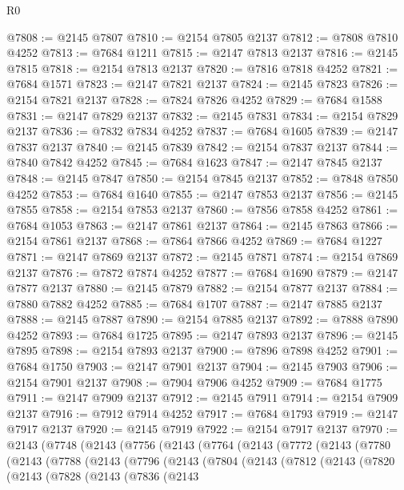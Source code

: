 \begin{lexlean}{R0}
\begin{coremodule}
@7808 := @2145 @7807
@7810 := @2154 @7805 @2137
@7812 := @7808 @7810 @4252
@7813 := @7684 @1211
@7815 := @2147 @7813 @2137
@7816 := @2145 @7815
@7818 := @2154 @7813 @2137
@7820 := @7816 @7818 @4252
@7821 := @7684 @1571
@7823 := @2147 @7821 @2137
@7824 := @2145 @7823
@7826 := @2154 @7821 @2137
@7828 := @7824 @7826 @4252
@7829 := @7684 @1588
@7831 := @2147 @7829 @2137
@7832 := @2145 @7831
@7834 := @2154 @7829 @2137
@7836 := @7832 @7834 @4252
@7837 := @7684 @1605
@7839 := @2147 @7837 @2137
@7840 := @2145 @7839
@7842 := @2154 @7837 @2137
@7844 := @7840 @7842 @4252
@7845 := @7684 @1623
@7847 := @2147 @7845 @2137
@7848 := @2145 @7847
@7850 := @2154 @7845 @2137
@7852 := @7848 @7850 @4252
@7853 := @7684 @1640
@7855 := @2147 @7853 @2137
@7856 := @2145 @7855
@7858 := @2154 @7853 @2137
@7860 := @7856 @7858 @4252
@7861 := @7684 @1053
@7863 := @2147 @7861 @2137
@7864 := @2145 @7863
@7866 := @2154 @7861 @2137
@7868 := @7864 @7866 @4252
@7869 := @7684 @1227
@7871 := @2147 @7869 @2137
@7872 := @2145 @7871
@7874 := @2154 @7869 @2137
@7876 := @7872 @7874 @4252
@7877 := @7684 @1690
@7879 := @2147 @7877 @2137
@7880 := @2145 @7879
@7882 := @2154 @7877 @2137
@7884 := @7880 @7882 @4252
@7885 := @7684 @1707
@7887 := @2147 @7885 @2137
@7888 := @2145 @7887
@7890 := @2154 @7885 @2137
@7892 := @7888 @7890 @4252
@7893 := @7684 @1725
@7895 := @2147 @7893 @2137
@7896 := @2145 @7895
@7898 := @2154 @7893 @2137
@7900 := @7896 @7898 @4252
@7901 := @7684 @1750
@7903 := @2147 @7901 @2137
@7904 := @2145 @7903
@7906 := @2154 @7901 @2137
@7908 := @7904 @7906 @4252
@7909 := @7684 @1775
@7911 := @2147 @7909 @2137
@7912 := @2145 @7911
@7914 := @2154 @7909 @2137
@7916 := @7912 @7914 @4252
@7917 := @7684 @1793
@7919 := @2147 @7917 @2137
@7920 := @2145 @7919
@7922 := @2154 @7917 @2137
@7970 := @2143
    (@7748
      (@2143
        (@7756
          (@2143
            (@7764
              (@2143
                (@7772
                  (@2143
                    (@7780
                      (@2143
                        (@7788
                          (@2143
                            (@7796
                              (@2143
                                (@7804
                                  (@2143
                                    (@7812
                                      (@2143
                                        (@7820
                                          (@2143
                                            (@7828
                                              (@2143
                                                (@7836
                                                  (@2143

\end{coremodule}
\end{lexlean}
